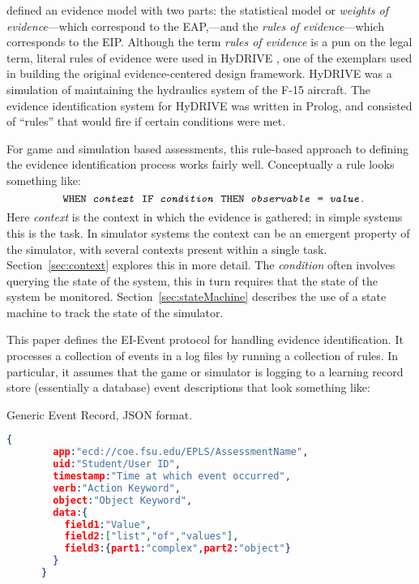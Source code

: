\documentclass{article}
\begin{document}
   defined an evidence model with two parts:
  the statistical model or \textit{weights of evidence}---which
  correspond to the EAP,---and the \textit{rules of evidence}---which
  corresponds to the EIP.  Although the term \textit{rules of
    evidence} is a pun on the legal term, literal rules of evidence
  were used in HyDRIVE \cite{HyDRIVE}, one of the exemplars used in
  building the original evidence-centered design framework.  HyDRIVE
  was a simulation of maintaining the hydraulics system of the F-15
  aircraft.  The evidence identification system for HyDRIVE was
  written in Prolog, and consisted of ``rules'' that would fire if
  certain conditions were met.

  For game and simulation based assessments, this rule-based approach
  to defining the evidence identification process works fairly well.
  Conceptually a rule looks something like:
  \begin{equation*}
    \texttt{ WHEN \emph{context} IF \emph{condition} THEN
      \emph{observable} = \emph{value}}.
  \end{equation*}
  Here \emph{context} is the context in which the evidence is
  gathered; in simple systems this is the task.  In simulator systems
  the context can be an emergent property of the simulator, with
  several contexts present within a single task.
  Section~\ref{sec:context} explores this in more detail. The
  \emph{condition} often involves querying the state of the system,
  this in turn requires that the state of the system be monitored.
  Section~\ref{sec:stateMachine} describes the use of a state machine
  to track the state of the simulator.

  This paper defines the EI-Event protocol for handling evidence
  identification.  It processes a collection of events in a log files
  by running a collection of rules.  In particular, it assumes that
  the game or simulator is logging to a learning record store
  (essentially a database) event descriptions that look something
  like:
  
  \begin{algorithm}
    \caption{Generic Event Record, JSON format.}
    \label{json:event}
    \begin{lstlisting}[language=json]
      {
        app:"ecd://coe.fsu.edu/EPLS/AssessmentName",
        uid:"Student/User ID",
        timestamp:"Time at which event occurred",
        verb:"Action Keyword",
        object:"Object Keyword",
        data:{
          field1:"Value",
          field2:["list","of","values"],
          field3:{part1:"complex",part2:"object"}
        }
      }
  \end{lstlisting}
  \end{algorithm}
\end{document}
